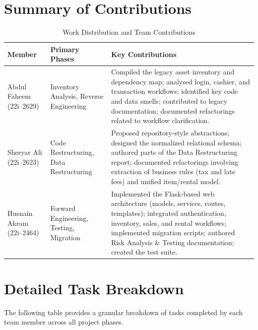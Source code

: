 \section{Summary of Contributions}

\begin{table}[h]
  \centering
  \caption{Work Distribution and Team Contributions}
  \begin{tabular}{p{4.0cm} p{3.0cm} p{6.0cm}}
    \toprule
    \textbf{Member} & \textbf{Primary Phases} & \textbf{Key Contributions} \\
    \midrule
    Abdul Faheem (22i--2629) &
      Inventory Analysis, Reverse Engineering &
      Compiled the legacy asset inventory and dependency map; analysed
      login, cashier, and transaction workflows; identified key code
      and data smells; contributed to legacy documentation;
      documented refactorings related to workflow clarification. \\[0.6em]
    Sheryar Ali (22i--2623) &
      Code Restructuring, Data Restructuring &
      Proposed repository-style abstractions; designed the normalized
      relational schema; authored parts of the Data Restructuring report;
      documented refactorings involving extraction of business rules
      (tax and late fees) and unified item/rental model. \\[0.6em]
    Husnain Akram (22i--2464) &
      Forward Engineering, Testing, Migration &
      Implemented the Flask-based web architecture (models, services,
      routes, templates); integrated authentication, inventory, sales,
      and rental workflows; implemented migration scripts; authored
      Risk Analysis \& Testing documentation; created the test suite. \\
    \bottomrule
  \end{tabular}
\end{table}

\section{Detailed Task Breakdown}

The following table provides a granular breakdown of tasks completed by
each team member across all project phases.

